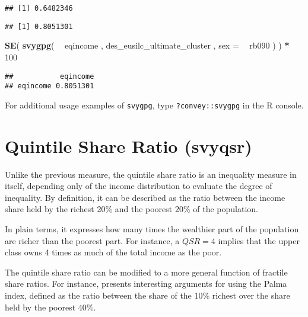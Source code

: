 \documentclass[]{book}
\newenvironment{Shaded}{\begin{snugshade}}{\end{snugshade}}
\newcommand{\CommentTok}[1]{\textcolor[rgb]{0.56,0.35,0.01}{\textit{#1}}}
\newcommand{\DataTypeTok}[1]{\textcolor[rgb]{0.13,0.29,0.53}{#1}}
\newcommand{\DecValTok}[1]{\textcolor[rgb]{0.00,0.00,0.81}{#1}}
\newcommand{\KeywordTok}[1]{\textcolor[rgb]{0.13,0.29,0.53}{\textbf{#1}}}
\newcommand{\NormalTok}[1]{#1}
\newcommand{\OperatorTok}[1]{\textcolor[rgb]{0.81,0.36,0.00}{\textbf{#1}}}
\newcommand{\StringTok}[1]{\textcolor[rgb]{0.31,0.60,0.02}{#1}}
\begin{document}
\begin{verbatim}
## [1] 0.6482346
\end{verbatim}

\begin{Shaded}
\end{Shaded}

\begin{verbatim}
## [1] 0.8051301
\end{verbatim}

\begin{Shaded}
\begin{Highlighting}[]
\KeywordTok{SE}\NormalTok{( }\KeywordTok{svygpg}\NormalTok{( }\OperatorTok{~}\StringTok{ }\NormalTok{eqincome , des_eusilc_ultimate_cluster , }\DataTypeTok{sex =} \OperatorTok{~}\StringTok{ }\NormalTok{rb090 ) ) }\OperatorTok{*}\StringTok{ }\DecValTok{100}
\end{Highlighting}
\end{Shaded}

\begin{verbatim}
##           eqincome
## eqincome 0.8051301
\end{verbatim}

For additional usage examples of \texttt{svygpg}, type \texttt{?convey::svygpg} in the R console.

\hypertarget{quintile-share-ratio-svyqsr}{%
\section{Quintile Share Ratio (svyqsr)}\label{quintile-share-ratio-svyqsr}}

Unlike the previous measure, the quintile share ratio is an inequality measure in itself, depending only of the income distribution to evaluate the degree of inequality. By definition, it can be described as the ratio between the income share held by the richest 20\% and the poorest 20\% of the population.

In plain terms, it expresses how many times the wealthier part of the population are richer than the poorest part. For instance, a \(QSR = 4\) implies that the upper class owns 4 times as much of the total income as the poor.

The quintile share ratio can be modified to a more general function of fractile share ratios. For instance, \citet{cobham2015} presents interesting arguments for using the Palma index, defined as the ratio between the share of the 10\% richest over the share held by the poorest 40\%.
\end{document}
